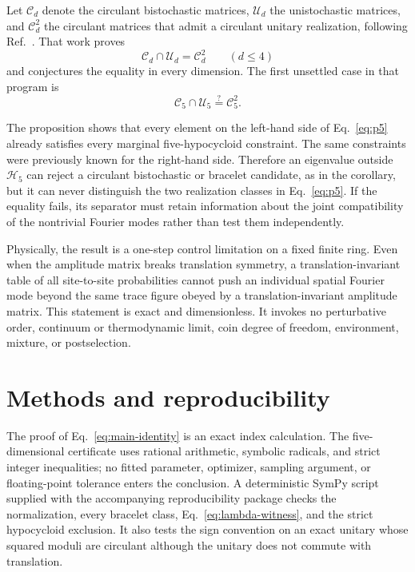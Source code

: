 \documentclass[aip,jmp,preprint,onecolumn,nofootinbib]{revtex4-2}
\newcommand{\Cd}{\mathcal C_d}
\newcommand{\Ud}{\mathcal U_d}
\begin{document}
Let $\Cd$ denote the circulant bistochastic matrices, $\Ud$ the unistochastic
matrices, and $\mathcal C_d^2$ the circulant matrices that admit a circulant
unitary realization, following Ref.~.  That
work proves
\begin{equation}
 \Cd\cap\Ud=\mathcal C_d^2\qquad (d\leq4)
 \label{eq:small-d}
\end{equation}
and conjectures the equality in every dimension.  The first unsettled case in
that program is
\begin{equation}
 \mathcal C_5\cap\mathcal U_5\stackrel{?}{=}\mathcal C_5^2.
 \label{eq:p5}
\end{equation}

The proposition shows that every element on the left-hand side of
Eq.~\eqref{eq:p5} already satisfies every marginal five-hypocycloid constraint.
The same constraints were previously known for the right-hand side.  Therefore
an eigenvalue outside $\mathcal H_5$ can reject a circulant bistochastic or
bracelet candidate, as in the corollary, but it can never distinguish the two
realization classes in Eq.~\eqref{eq:p5}.  If the equality fails, its separator
must retain information about the joint compatibility of the nontrivial
Fourier modes rather than test them independently.

Physically, the result is a one-step control limitation on a fixed finite ring.
Even when the amplitude matrix breaks translation symmetry, a
translation-invariant table of all site-to-site probabilities cannot push an
individual spatial Fourier mode beyond the same trace figure obeyed by a
translation-invariant amplitude matrix.  This statement is exact and
dimensionless.  It invokes no perturbative order, continuum or thermodynamic
limit, coin degree of freedom, environment, mixture, or postselection.

\section{Methods and reproducibility}

The proof of Eq.~\eqref{eq:main-identity} is an exact index calculation.  The
five-dimensional certificate uses rational arithmetic, symbolic radicals, and
strict integer inequalities; no fitted parameter, optimizer, sampling
argument, or floating-point tolerance enters the conclusion.  A deterministic
SymPy script supplied with the accompanying reproducibility package checks the
normalization, every bracelet class, Eq.~\eqref{eq:lambda-witness}, and the
strict hypocycloid exclusion.  It also tests the sign convention on an exact
unitary whose squared moduli are circulant although the unitary does not commute
with translation.
\end{document}

